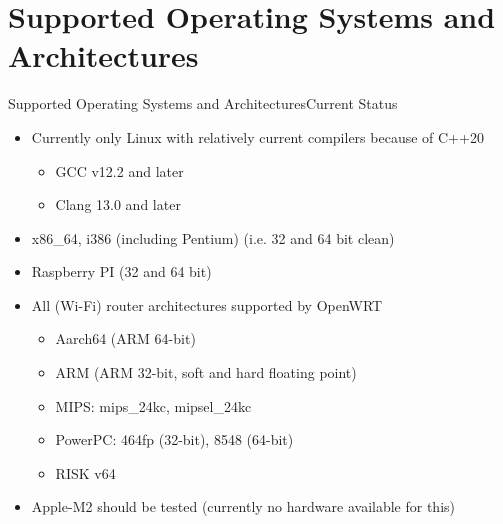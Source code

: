 ﻿\section{Supported Operating Systems and Architectures}

\begin{frame}{Supported Operating Systems and Architectures}{Current Status}
   \begin{description}
     \item [Operating Systems]
     \begin{itemize}
       \item Currently only Linux with relatively current compilers because of C++20
       \begin{itemize}
         \item GCC v12.2 and later
         \item Clang 13.0 and later
       \end{itemize}
     \end{itemize}
     \item [Hardware and Processor Architectures]
     \begin{itemize}
       \item x86\_{}64, i386 (including Pentium) (i.e. 32 and 64 bit clean)
       \item Raspberry PI (32 and 64 bit)
       \item All (Wi-Fi) router architectures supported by \alert{OpenWRT} \href{https://openwrt.org/}{}
       \begin{itemize}
         \item Aarch64 (ARM 64-bit)
         \item ARM (ARM 32-bit, soft and hard floating point)
         \item MIPS: mips\_24kc, mipsel\_24kc
         \item PowerPC: 464fp (32-bit), 8548 (64-bit)
         \item RISK v64
       \end{itemize}
       \item Apple-M2 \alert{should be tested} (currently no hardware available for this)
     \end{itemize}
   \end{description}
\end{frame}